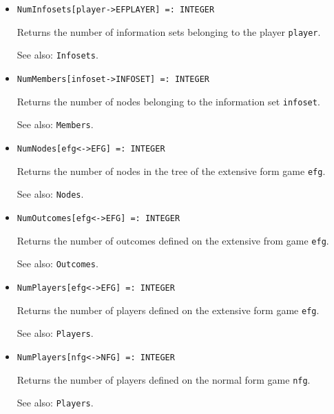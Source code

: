 \begin{itemize}
\item
\protect \large \begin{verbatim}
NumInfosets[player->EFPLAYER] =: INTEGER
\end{verbatim}\normalsize

\bd
Returns the number of information sets belonging to the
player \verb+player+.
\item
[See also:] {\tt Infosets}.
\ed

\item
\protect \large \begin{verbatim}
NumMembers[infoset->INFOSET] =: INTEGER
\end{verbatim}\normalsize

\bd
Returns the number of nodes belonging to the information
set \verb+infoset+.
\item
[See also:] {\tt Members}.
\ed

\item
\protect \large \begin{verbatim}
NumNodes[efg<->EFG] =: INTEGER
\end{verbatim}\normalsize

\bd
Returns the number of nodes in the tree of the extensive form
game \verb+efg+.
\item
[See also:] {\tt Nodes}.
\ed

\item
\protect \large \begin{verbatim}
NumOutcomes[efg<->EFG] =: INTEGER
\end{verbatim} \normalsize

\bd
Returns the number of outcomes defined on the extensive from
game \verb+efg+.
\item
[See also:] {\tt Outcomes}.
\ed

\item
\protect \large \begin{verbatim}
NumPlayers[efg<->EFG] =: INTEGER
\end{verbatim} \normalsize

\bd
Returns the number of players defined on the extensive form
game \verb+efg+.
\item
[See also:] {\tt Players}.
\ed

\item
\protect \large \begin{verbatim}
NumPlayers[nfg<->NFG] =: INTEGER
\end{verbatim} \normalsize

\bd
Returns the number of players defined on the normal form
game \verb+nfg+.
\item
[See also:] {\tt Players}.
\ed


\end{itemize}
